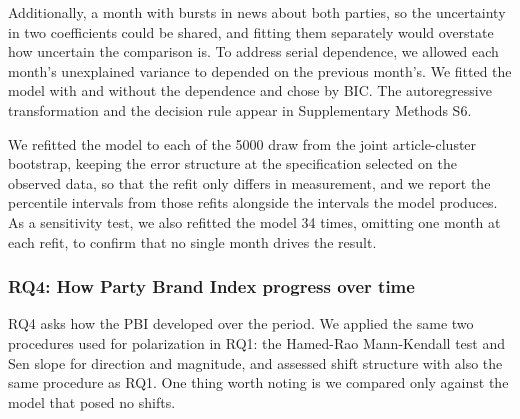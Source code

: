 Additionally, a month with bursts in news about both parties, so the uncertainty in two coefficients could be shared, and fitting them separately would overstate how uncertain the comparison is. To address serial dependence, we allowed each month's unexplained variance to depended on the previous month's. We fitted the model with and without the dependence and chose by BIC. The autoregressive transformation and the decision rule appear in Supplementary Methods S6.

We refitted the model to each of the 5000 draw from the joint article-cluster bootstrap, keeping the error structure at the specification selected on the observed data, so that the refit only differs in measurement, and we report the percentile intervals from those refits alongside the intervals the model produces. As a sensitivity test, we also refitted the model 34 times, omitting one month at each refit, to confirm that no single month drives the result.

\subsubsection{RQ4: How Party Brand Index progress over time}

RQ4 asks how the PBI developed over the period. We applied the same two procedures used for polarization in RQ1: the Hamed-Rao Mann-Kendall test and Sen slope for direction and magnitude, and assessed shift structure with also the same procedure as RQ1. One thing worth noting is we compared only against the model that posed no shifts.

